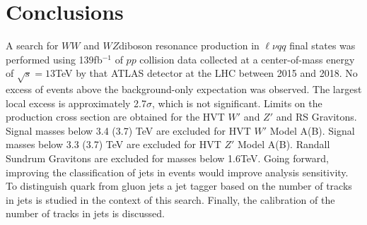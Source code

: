 \label{ch:conclusion}
\chapter{Conclusions}

A search for $WW$ and $WZ $diboson resonance production in $\ell \nu qq $ final states was performed using 139fb$^{-1}$ of $pp$ collision data collected at a center-of-mass energy of $\sqrt{s}=13$TeV by that ATLAS detector at the LHC between 2015 and 2018. No excess of events above the background-only expectation was observed. The largest local excess is approximately 2.7$\sigma$, which is not significant. Limits on the production cross section are obtained for the HVT $W'$ and $Z'$ and RS Gravitons. Signal masses below 3.4 (3.7) TeV are excluded for HVT $W'$ Model A(B). Signal masses below 3.3 (3.7) TeV are excluded for HVT $Z'$ Model A(B). Randall Sundrum Gravitons are excluded for masses below 1.6TeV. Going forward, improving the classification of jets in events would improve analysis sensitivity. To distinguish quark from gluon jets a jet tagger based on the number of tracks in jets is studied in the context of this search. Finally, the calibration of the number of tracks in jets is discussed. 